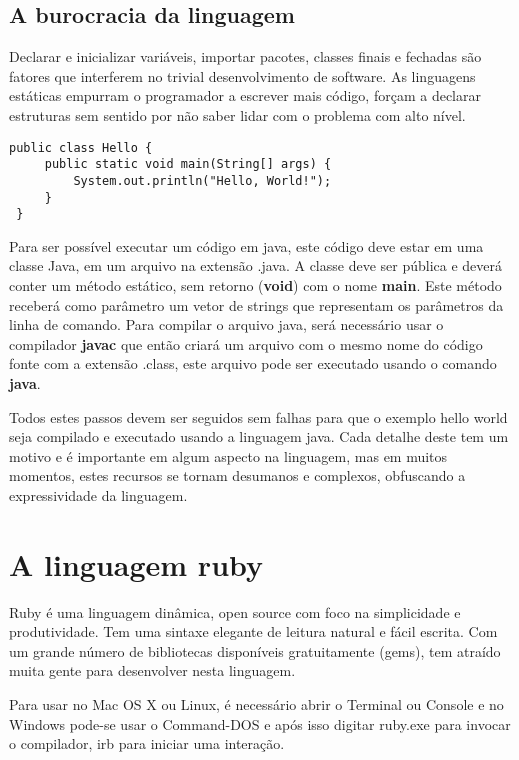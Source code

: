 \documentclass[espaco=simples,appendix=Name]{abnt}
\begin{document}
\section { A burocracia da linguagem }

Declarar e inicializar variáveis, importar pacotes, classes finais e fechadas são fatores que interferem no trivial desenvolvimento de software. As linguagens estáticas empurram o programador a escrever mais código, forçam a declarar estruturas sem sentido por não saber lidar com o problema com alto nível.

\begin{lstlisting}[label=HelloWorldJava, caption=Programa Hello World em Java]
 public class Hello {
     public static void main(String[] args) {
         System.out.println("Hello, World!");
     }
 }
\end{lstlisting}

Para ser possível executar um código em java, este código deve estar em uma classe Java, em um arquivo na extensão .java. A classe deve ser pública e deverá conter um método estático, sem retorno (\textbf{void}) com o nome \textbf{main}. Este método receberá como parâmetro um vetor de strings que representam os parâmetros da linha de comando. Para compilar o arquivo java, será necessário usar o compilador \textbf{javac} que então criará um arquivo com o mesmo nome do código fonte com a extensão .class, este arquivo pode ser executado usando o comando \textbf{java}. 

Todos estes passos devem ser seguidos sem falhas para que o exemplo hello world seja compilado e executado usando a linguagem java. Cada detalhe deste tem um motivo e é importante em algum aspecto na linguagem, mas em muitos momentos, estes recursos se tornam desumanos e complexos, obfuscando a expressividade da linguagem.

\chapter { A linguagem ruby }

Ruby é uma linguagem dinâmica, open source com foco na simplicidade e produtividade. Tem uma sintaxe elegante de leitura natural e fácil escrita. Com um grande número de bibliotecas disponíveis gratuitamente (gems), tem atraído muita gente para desenvolver nesta linguagem.

Para usar no Mac OS X ou Linux, é necessário abrir o {Terminal ou Console} e no Windows pode-se usar o Command-DOS e após isso digitar ruby.exe para invocar o compilador, irb para iniciar uma interação.
\end{document}

